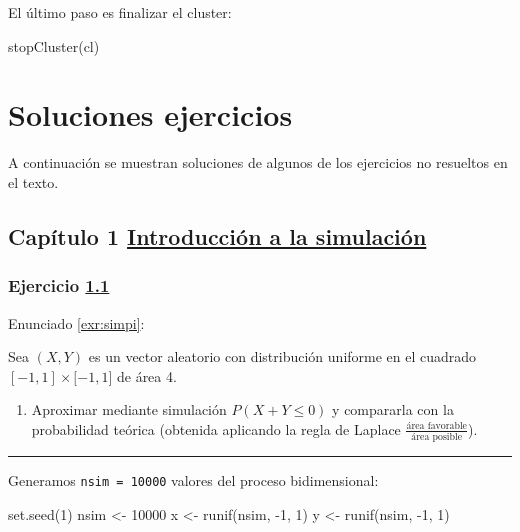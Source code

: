 \documentclass[
  10pt,
]{book}
\newenvironment{Shaded}{\begin{snugshade}}{\end{snugshade}}
\newcommand{\DecValTok}[1]{\textcolor[rgb]{0.00,0.00,0.81}{#1}}
\newcommand{\FunctionTok}[1]{\textcolor[rgb]{0.00,0.00,0.00}{#1}}
\newcommand{\NormalTok}[1]{#1}
\newcommand{\OtherTok}[1]{\textcolor[rgb]{0.56,0.35,0.01}{#1}}
\newcommand{\SpecialCharTok}[1]{\textcolor[rgb]{0.00,0.00,0.00}{#1}}
\providecommand{\tightlist}{%
  \setlength{\itemsep}{0pt}\setlength{\parskip}{0pt}}
\theoremstyle{break}
\theoremstyle{nonumberplain}
\begin{document}
El último paso es finalizar el cluster:

\begin{Shaded}
\begin{Highlighting}[]
\FunctionTok{stopCluster}\NormalTok{(cl)}
\end{Highlighting}
\end{Shaded}

\hypertarget{soluciones}{%
\chapter{Soluciones ejercicios}\label{soluciones}}

A continuación se muestran soluciones de algunos de los ejercicios no resueltos en el texto.

\hypertarget{capuxedtulo-1-introducciuxf3n-a-la-simulaciuxf3n}{%
\section{\texorpdfstring{Capítulo 1 \href{intro.html}{Introducción a la simulación}}{Capítulo 1 Introducción a la simulación}}\label{capuxedtulo-1-introducciuxf3n-a-la-simulaciuxf3n}}

\hypertarget{sol-simpi}{%
\subsection{\texorpdfstring{Ejercicio \href{ejercicios.html\#exr:simpi}{1.1}}{Ejercicio 1.1}}\label{sol-simpi}}

Enunciado \ref{exr:simpi}:

Sea \((X,Y)\) es un vector aleatorio con distribución uniforme en el
cuadrado \([-1,1]\times\lbrack-1,1]\) de área 4.

\begin{enumerate}
\def\labelenumi{\alph{enumi})}
\tightlist
\item
  Aproximar mediante simulación \(P\left(X + Y \leq 0 \right)\) y
  compararla con la probabilidad teórica (obtenida aplicando la
  regla de Laplace \(\frac{\text{área favorable}}{\text{área posible}}\)).
\end{enumerate}

\begin{center}\rule{0.5\linewidth}{0.5pt}\end{center}

Generamos \texttt{nsim\ =\ 10000} valores del proceso bidimensional:

\begin{Shaded}
\begin{Highlighting}[]
\FunctionTok{set.seed}\NormalTok{(}\DecValTok{1}\NormalTok{)}
\NormalTok{nsim }\OtherTok{\textless{}{-}} \DecValTok{10000}
\NormalTok{x }\OtherTok{\textless{}{-}} \FunctionTok{runif}\NormalTok{(nsim, }\SpecialCharTok{{-}}\DecValTok{1}\NormalTok{, }\DecValTok{1}\NormalTok{)}
\NormalTok{y }\OtherTok{\textless{}{-}} \FunctionTok{runif}\NormalTok{(nsim, }\SpecialCharTok{{-}}\DecValTok{1}\NormalTok{, }\DecValTok{1}\NormalTok{)}
\end{Highlighting}
\end{Shaded}
\end{document}
